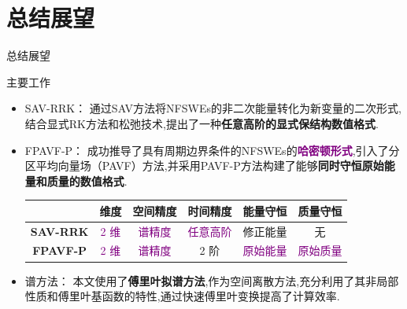 \documentclass[aspectratio=169]{beamer}
\numberwithin{theorem}{section} %
\numberwithin{equation}{section}%
\numberwithin{figure}{section}%
\numberwithin{table}{section}%
\begin{document}
\section{总结展望}
\begin{frame}{总结展望}
	\begin{block}{主要工作}
			\begin{itemize}
				\item \textcolor[rgb]{0.227,0.373,0.306}{SAV-RRK：} 通过SAV方法将NFSWEs的非二次能量转化为新变量的二次形式,结合显式RK方法和松弛技术,提出了一种\textbf{\textcolor[rgb]{0.227,0.373,0.306}{任意高阶的显式保结构数值格式}}.
				\item \textcolor[rgb]{0.227,0.373,0.306}{FPAVF-P：} 成功推导了具有周期边界条件的NFSWEs的\textbf{\textcolor{purple}{哈密顿形式}},引入了分区平均向量场（PAVF）方法,并采用PAVF-P方法构建了能够\textbf{\textcolor[rgb]{0.227,0.373,0.306}{同时守恒原始能量和质量的数值格式}}.
				\begin{table}[htbp]
					\centering
					  \begin{tabular}{cccccc}
					  \toprule
					  \textcolor[rgb]{0.227,0.373,0.306}{} & \textcolor[rgb]{0.227,0.373,0.306}{\textbf{维度}} & \textcolor[rgb]{0.227,0.373,0.306}{\textbf{空间精度}} & \textcolor[rgb]{0.227,0.373,0.306}{\textbf{时间精度}} & \textcolor[rgb]{0.227,0.373,0.306}{\textbf{能量守恒}} & \textcolor[rgb]{0.227,0.373,0.306}{\textbf{质量守恒}} \\
					  \midrule
					  \textcolor[rgb]{0.227,0.373,0.306}{\textbf{SAV-RRK}} & \textcolor{purple}{2 维}   & \textcolor{purple}{谱精度}   & \textcolor{purple}{任意高阶}  & 修正能量  & 无 \\
					  \midrule
					  \textcolor[rgb]{0.227,0.373,0.306}{\textbf{FPAVF-P}} & \textcolor{purple}{2 维}   & \textcolor{purple}{谱精度}   & 2 阶   & \textcolor{purple}{原始能量}  & \textcolor{purple}{原始质量} \\
					  \bottomrule
					  \end{tabular}%
					\label{tab:3}%
				  \end{table}%
				\item \textcolor[rgb]{0.227,0.373,0.306}{谱方法：} 本文使用了\textbf{\textcolor[rgb]{0.227,0.373,0.306}{傅里叶拟谱方法}},作为空间离散方法,充分利用了其非局部性质和傅里叶基函数的特性,通过快速傅里叶变换提高了计算效率.
			\end{itemize}
			
		\end{block}
		
\end{frame}
\end{document}
